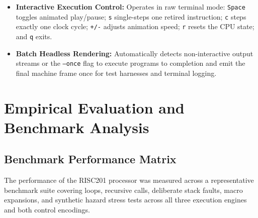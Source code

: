 \documentclass[11pt,a4paper]{article}
\begin{document}
\begin{itemize}
\begin{itemize}
    \end{itemize}
    \item \textbf{Interactive Execution Control:} Operates in raw terminal mode: \texttt{Space} toggles animated play/pause; \texttt{s} single-steps one retired instruction; \texttt{c} steps exactly one clock cycle; \texttt{+/-} adjusts animation speed; \texttt{r} resets the CPU state; and \texttt{q} exits.
    \item \textbf{Batch Headless Rendering:} Automatically detects non-interactive output streams or the \texttt{--once} flag to execute programs to completion and emit the final machine frame once for test harnesses and terminal logging.
\end{itemize}

\section{Empirical Evaluation and Benchmark Analysis}

\subsection{Benchmark Performance Matrix}
The performance of the RISC201 processor was measured across a representative benchmark suite covering loops, recursive calls, deliberate stack faults, macro expansions, and synthetic hazard stress tests across all three execution engines and both control encodings.
\end{document}
